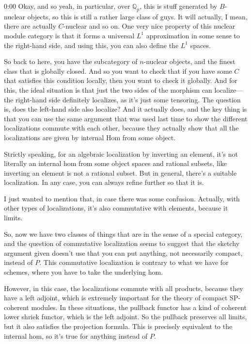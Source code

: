 \begin{unfinished}{0:00}
Okay, and so yeah, in particular, over $\mathbb{Q}_p$, this is stuff generated by $B$-nuclear objects, so this is still a rather large class of guys. It will actually, I mean, there are actually $C$-nuclear and so on. One very nice property of this nuclear module category is that it forms a universal $L^1$ approximation in some sense to the right-hand side, and using this, you can also define the $L^1$ spaces.

So back to here, you have the subcategory of $n$-nuclear objects, and the finest class that is globally closed. And so you want to check that if you have some $C$ that satisfies this condition locally, then you want to check it globally. And for this, the ideal situation is that just the two sides of the morphism can localize---the right-hand side definitely localizes, as it's just some tensoring. The question is, does the left-hand side also localize? And it actually does, and the key thing is that you can use the same argument that was used last time to show the different localizations commute with each other, because they actually show that all the localizations are given by internal Hom from some object.

Strictly speaking, for an algebraic localization by inverting an element, it's not literally an internal hom from some object spaces and rational subsets, like inverting an element is not a rational subset. But in general, there's a suitable localization. In any case, you can always refine further so that it is.

I just wanted to mention that, in case there was some confusion. Actually, with other types of localizations, it's also commutative with elements, because it limits. 

So, now we have two classes of things that are in the sense of a special category, and the question of commutative localization seems to suggest that the sketchy argument given doesn't use that you can put anything, not necessarily compact, instead of $P$. This commutative localization is contrary to what we have for schemes, where you have to take the underlying hom.

However, in this case, the localizations commute with all products, because they have a left adjoint, which is extremely important for the theory of compact SP-coherent modules. In these situations, the pullback functor has a kind of coherent lower shriek functor, which is the left adjoint. So the pullback preserves all limits, but it also satisfies the projection formula. This is precisely equivalent to the internal hom, so it's true for anything instead of $P$.


\end{unfinished}
